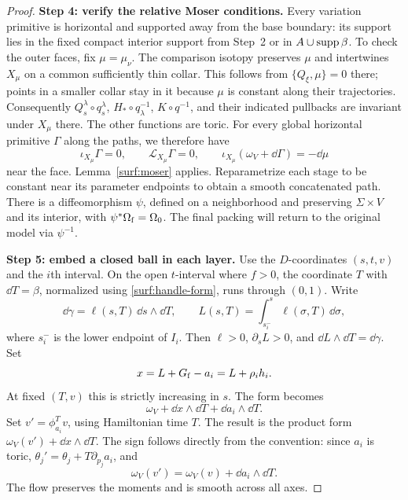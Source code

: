 \begin{proof}
\medskip\noindent
\textbf{Step 4: verify the relative Moser conditions.}
Every variation primitive is horizontal and supported away from
the base boundary: its support lies in the fixed compact interior
support from Step~2 or in $A\cup\operatorname{supp}\beta$.
To check the outer faces, fix $\mu=\mu_\nu$.  The comparison
isotopy preserves $\mu$ and intertwines $X_\mu$ on a common
sufficiently thin collar.  This follows from
$\{Q_\xi,\mu\}=0$ there; points in a smaller collar stay in it
because $\mu$ is constant along their trajectories.
Consequently $Q_s^\lambda\circ q_s^\lambda$,
$H_*\circ q_\lambda^{-1}$, $K\circ q^{-1}$, and their indicated
pullbacks are invariant under $X_\mu$ there.  The other functions
are toric.  For every global horizontal primitive $\Gamma$ along
the paths, we therefore have
\[
 \iota_{X_\mu}\Gamma=0,\qquad
 \mathcal L_{X_\mu}\Gamma=0,\qquad
 \iota_{X_\mu}(\omega_V+\dd\Gamma)=-\dd\mu
\]
near the face.
Lemma~\ref{surf:moser} applies.  Reparametrize each stage to be
constant near its parameter endpoints to obtain a smooth
concatenated path.  There is a diffeomorphism $\psi$, defined
on a neighborhood and preserving $\Sigma\times V$ and its
interior, with $\psi^*\Omega_{\rm f}=\Omega_0$.
The final packing will return to the original model via $\psi^{-1}$.

\medskip\noindent
\textbf{Step 5: embed a closed ball in each layer.}
Use the $D$-coordinates $(s,t,v)$ and the $i$th interval.
On the open $t$-interval where $f>0$, the coordinate $T$ with
$\dd T=\beta$, normalized using \eqref{surf:handle-form}, runs
through $(0,1)$.  Write
\[
 \dd\gamma=\ell(s,T)\,\dd s\wedge\dd T,\qquad
 L(s,T)=\int_{s_i^-}^{s}\ell(\sigma,T)\,\dd\sigma ,
\]
where $s_i^-$ is the lower endpoint of $I_i$.
Then $\ell>0$, $\partial_sL>0$, and
$\dd L\wedge\dd T=\dd\gamma$.
Set
\begin{equation}\label{surf:strip-coordinate}
        x=L+G_{\rm f}-a_i=L+\rho_i h_i .
\end{equation}
At fixed $(T,v)$ this is strictly increasing in $s$.
The form becomes
\[
                \omega_V+\dd x\wedge\dd T+\dd a_i\wedge\dd T.
\]
Set $v'=\phi_{a_i}^{T}v$, using Hamiltonian time $T$.
The result is the product form $\omega_V(v')+\dd x\wedge\dd T$.
The sign follows directly from the convention: since $a_i$ is
toric, $\theta_j'=\theta_j+T\partial_{p_j}a_i$, and
\begin{equation}\label{surf:product-sign}
                 \omega_V(v')=\omega_V(v)+\dd a_i\wedge\dd T .
\end{equation}
The flow preserves the moments and is smooth across all axes.


\end{proof}
